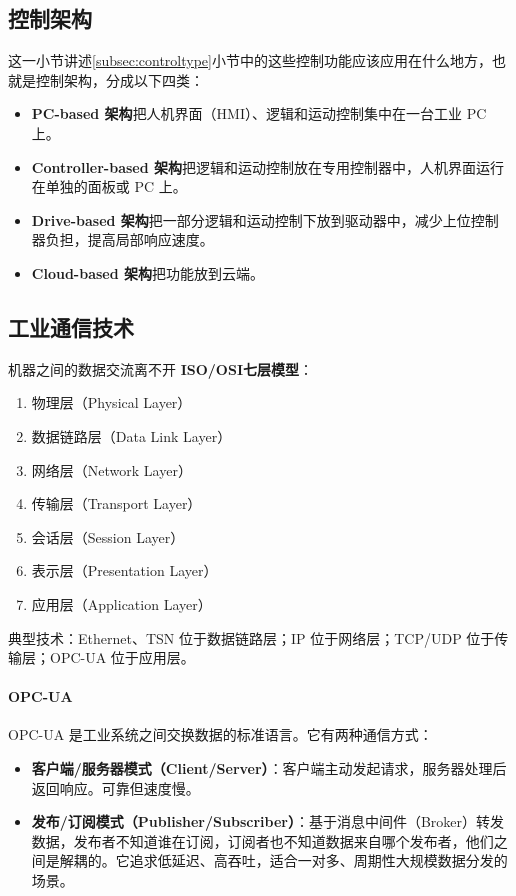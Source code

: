 \subsection{控制架构}

这一小节讲述\ref{subsec:controltype}小节中的这些控制功能应该应用在什么地方，也就是控制架构，分成以下四类：
\begin{itemize}
    \item \textbf{PC-based 架构}把人机界面（HMI）、逻辑和运动控制集中在一台工业 PC 上。
    \item \textbf{Controller-based 架构}把逻辑和运动控制放在专用控制器中，人机界面运行在单独的面板或 PC 上。
    \item \textbf{Drive-based 架构}把一部分逻辑和运动控制下放到驱动器中，减少上位控制器负担，提高局部响应速度。
    \item \textbf{Cloud-based 架构}把功能放到云端。
\end{itemize}


\subsection{工业通信技术}
\label{subsec:industrialcommunication}

机器之间的数据交流离不开 \textbf{ISO/OSI七层模型}：
\begin{enumerate}
    \item 物理层（Physical Layer）
    \item 数据链路层（Data Link Layer）
    \item 网络层（Network Layer）
    \item 传输层（Transport Layer）
    \item 会话层（Session Layer）
    \item 表示层（Presentation Layer）
    \item 应用层（Application Layer）
\end{enumerate}

典型技术：Ethernet、TSN 位于数据链路层；IP 位于网络层；TCP/UDP 位于传输层；OPC-UA 位于应用层。

\paragraph{OPC-UA}

OPC-UA 是工业系统之间交换数据的标准语言。它有两种通信方式：
\begin{itemize}
    \item \textbf{客户端/服务器模式（Client/Server）}：客户端主动发起请求，服务器处理后返回响应。可靠但速度慢。
    \item \textbf{发布/订阅模式（Publisher/Subscriber）}：基于消息中间件（Broker）转发数据，发布者不知道谁在订阅，订阅者也不知道数据来自哪个发布者，他们之间是解耦的。它追求低延迟、高吞吐，适合一对多、周期性大规模数据分发的场景。
\end{itemize}

